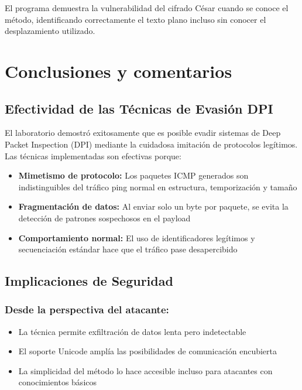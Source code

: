 \documentclass[letter,12pt]{article}
\begin{document}
El programa demuestra la vulnerabilidad del cifrado César cuando se conoce el método, identificando correctamente el texto plano incluso sin conocer el desplazamiento utilizado.



\section*{Conclusiones y comentarios}

\subsection*{Efectividad de las Técnicas de Evasión DPI}

El laboratorio demostró exitosamente que es posible evadir sistemas de Deep Packet Inspection (DPI) mediante la cuidadosa imitación de protocolos legítimos. Las técnicas implementadas son efectivas porque:

\begin{itemize}
    \item \textbf{Mimetismo de protocolo:} Los paquetes ICMP generados son indistinguibles del tráfico ping normal en estructura, temporización y tamaño
    \item \textbf{Fragmentación de datos:} Al enviar solo un byte por paquete, se evita la detección de patrones sospechosos en el payload
    \item \textbf{Comportamiento normal:} El uso de identificadores legítimos y secuenciación estándar hace que el tráfico pase desapercibido
\end{itemize}

\subsection*{Implicaciones de Seguridad}

\subsubsection*{Desde la perspectiva del atacante:}
\begin{itemize}
    \item La técnica permite exfiltración de datos lenta pero indetectable
    \item El soporte Unicode amplía las posibilidades de comunicación encubierta
    \item La simplicidad del método lo hace accesible incluso para atacantes con conocimientos básicos
\end{itemize}
\end{document}
